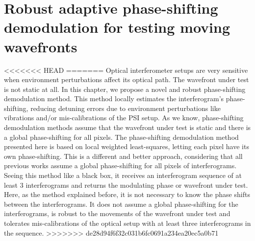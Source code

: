 \chapter{Robust adaptive phase-shifting demodulation for testing moving 
wavefronts}

<<<<<<< HEAD
=======
Optical interferometer setups are very sensitive when environment
perturbations affect its optical path. The wavefront under test is not
static at all. In this chapter, we propose a novel and robust phase-shifting
demodulation method. This method locally estimates the interferogram's
phase-shifting, reducing detuning errors due to environment perturbations
like vibrations and/or mis-calibrations of the PSI setup. 
As we know, phase-shifting demodulation methods assume that the
wavefront under test is static and there is a global phase-shifting for all
pixels. The phase-shifting demodulation method presented here is based on
local weighted least-squares, letting each pixel have its own phase-shifting.
This is a different and better approach, considering that all previous works
assume a global phase-shifting for all pixels of interferograms. Seeing this
method like a black box, it receives an interferogram sequence of at least 3
interferograms and returns the modulating phase or wavefront under test.
Here, as the method explained before, it is not necessary to know the phase 
shifts between the interferograms.
It does not assume a global phase-shifting for the interferograms, is robust
to the movements of the wavefront under test and tolerates
mis-calibrations of the optical setup with at least three
interferograms in the sequence.
>>>>>>> de28d94f6f32c031b6fc0691a234ea20ec5a0b71

